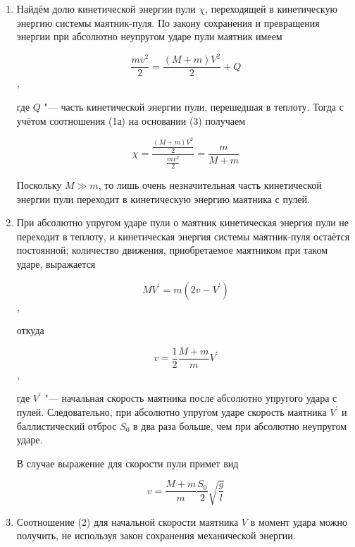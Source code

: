 \begin{enumerate}
    \item Найдём долю кинетической энергии пули $\chi$,
    переходящей в кинетическую энергию системы маятник-пуля.
    По закону сохранения и превращения энергии при абсолютно неупругом ударе пули  маятник имеем

    \begin{equation} 
            \frac{mv^2}{2}=\frac{(M+m)V^2}{2}+Q 
    \end{equation},

    где $Q$ "--- часть кинетической энергии пули, перешедшая в теплоту.
    Тогда с учётом соотношения (1а) на основании (3) получаем

    \begin{equation} 
            \chi=\frac{\frac{(M+m)V^2}{2}}{\frac{mv^2}{2}}=\frac{m}{M+m}
    \end{equation}

    Поскольку $M \gg m$, то лишь очень незначительная часть кинетической энергии пули переходит в кинетическую энергию маятника с пулей.

    \item При абсолютно упругом ударе пули о маятник кинетическая энергия пули не переходит в теплоту,
    и кинетическая энергия системы маятник-пуля остаётся постоянной;
    количество движения, приобретаемое маятником при таком ударе, выражается

    \begin{equation} 
            MV^\prime=m(2v-V^\prime)
    \end{equation},

    откуда
                    
    \begin{equation} 
            v=\frac{1}{2}\frac{M+m}{m}V^\prime 
    \end{equation},

    где $V^\prime$ "--- начальная скорость маятника после абсолютно упругого удара с пулей.
    Следовательно, при абсолютно упругом ударе скорость маятника $V^\prime$ и баллистический отброс $S_0$ в два раза больше,
    чем при абсолютно неупругом ударе.

    В случае выражение для скорости пули примет вид

    \begin{equation} 
            v=\frac{M+m}{m}\frac{S_0}{2}\sqrt{\frac{g}{l}} 
    \end{equation}

    \item Соотношение (2) для начальной скорости маятника $V$ в момент удара можно получить, не используя закон сохранения механической энергии.


\end{enumerate}
